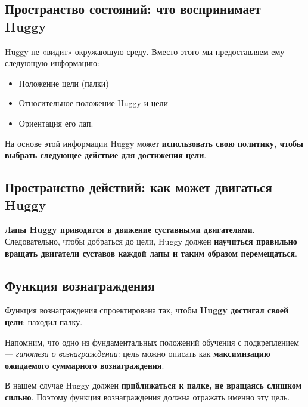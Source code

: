 \documentclass[11pt,a4paper]{article}
\begin{document}
\subsection{Пространство состояний: что воспринимает Huggy}\label{the-state-space-what-huggy-perceives.}

Huggy не «видит» окружающую среду. Вместо этого мы предоставляем ему следующую информацию:

\begin{itemize}
\tightlist
\item
  Положение цели (палки)
\item
  Относительное положение Huggy и цели
\item
  Ориентация его лап.
\end{itemize}

На основе этой информации Huggy может \textbf{использовать свою политику, чтобы выбрать следующее действие для достижения цели}.

\subsection{Пространство действий: как может двигаться Huggy}\label{the-action-space-what-moves-huggy-can-perform}


\textbf{Лапы Huggy приводятся в движение суставными двигателями}. Следовательно, чтобы добраться до цели, Huggy должен \textbf{научиться правильно вращать двигатели суставов каждой лапы и таким образом перемещаться}.

\subsection{Функция вознаграждения}\label{the-reward-function}

Функция вознаграждения спроектирована так, чтобы \textbf{Huggy достигал своей цели}: находил палку.

Напомним, что одно из фундаментальных положений обучения с подкреплением --- \emph{гипотеза о вознаграждении}: цель можно описать как \textbf{максимизацию ожидаемого суммарного вознаграждения}.

В нашем случае Huggy должен \textbf{приближаться к палке, не вращаясь слишком сильно}. Поэтому функция вознаграждения должна отражать именно эту цель.
\end{document}
